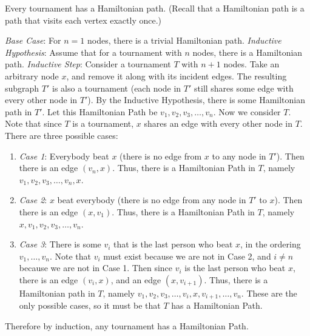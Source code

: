 \vspace{2mm}
\question Every tournament has a Hamiltonian path. 
(Recall that a Hamiltonian path is a path that visits each vertex 
exactly once.)

\begin{solution}[2.5 in]
\textit{Base Case}: For $n = 1$ nodes, there is a trivial 
Hamiltonian path. \newline
\textit{Inductive Hypothesis}: Assume that for a tournament 
with $n$ nodes, there is a Hamiltonian path.\newline
\textit{Inductive Step}: Consider a tournament $T$ with $n + 1$ nodes. 
Take an arbitrary node $x$, and remove it along with its incident 
edges. The resulting subgraph $T$\ensuremath{'} is also a tournament 
(each node in $T$\ensuremath{'} still shares some edge with every 
other node in $T$\ensuremath{'}). By the Inductive Hypothesis, 
there is some Hamiltonian path in $T$\ensuremath{'}. Let this 
Hamiltonian Path be $v_1, v_2, v_3, \dotsc , v_n$. Now we consider 
$T$. Note that since $T$ is a tournament, $x$ shares an edge with 
every other node in $T$. There are three possible cases:
\begin{enumerate}[label= ]
	\item \textit{Case 1}: Everybody beat $x$ (there is no edge 
	from $x$ to any node in $T$\ensuremath{'}). Then there is an 
	edge $(v_n, x)$. Thus, there is a Hamiltonian Path in $T$, 
	namely $v_1, v_2, v_3, \dotsc, v_n, x$.
	\item \textit{Case 2}: $x$ beat everybody (there is no edge 
	from any node in $T$\ensuremath{'} to $x$). Then there is an 
	edge $(x, v_1)$. Thus, there is a Hamiltonian Path in $T$, 
	namely $x, v_1, v_2, v_3, \dotsc , v_n$.
	 \item \textit{Case 3}: There is some $v_i$ that is the last 
	 person who beat $x$, in the ordering $v_1, \dotsc , v_n$. 
	 Note that $v_i$ must exist because we are not in Case 2, and 
	 $i \neq n$ because we are not in Case 1. Then since $v_i$ is 
	 the last person who beat $x$, there is an edge $(v_i, x)$, and 
	 an edge $(x, v_{i+1})$. Thus, there is a Hamiltonian path in $T$, 
	 namely $v_1, v_2, v_3, \dotsc , v_i, x, v_{i+1}, \dotsc , v_n$.
These are the only possible cases, so it must be that $T$ has a Hamiltonian Path.
\end{enumerate}
Therefore by induction, any tournament has a Hamiltonian Path. \newline
\end{solution}

